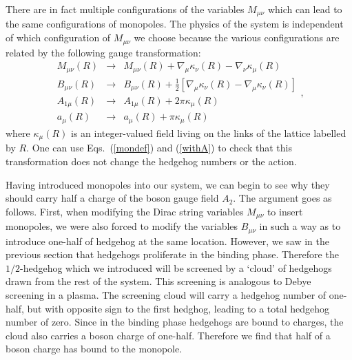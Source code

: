 \documentclass[prb,twocolumn]{revtex4-1}
\begin{document}
There are in fact multiple configurations of the variables $M_{\mu\nu}$ which can lead to the same configurations of  monopoles. The physics of the system is independent of which configuration of $M_{\mu\nu}$ we choose because the various configurations are related by the following gauge transformation:
\begin{equation}
\begin{array}{ccc}
M_{\mu\nu}(R)&\rightarrow&M_{\mu\nu}(R)+\nabla_\mu \kappa_\nu(R)-\nabla_\nu \kappa_\mu(R) \\
B_{\mu\nu}(R)&\rightarrow&B_{\mu\nu}(R)+\frac{1}{2}[\nabla_\mu \kappa_\nu(R)-\nabla_\mu \kappa_\nu(R)] \\
A_{1\mu}(R)&\rightarrow&A_{1\mu}(R)+2\pi \kappa_\mu(R)\\
a_\mu(R)&\rightarrow&a_\mu(R)+\pi \kappa_\mu(R)
\end{array},
\end{equation}
where $\kappa_\mu(R)$ is an integer-valued field living on the links of the lattice labelled by $R$. One can use Eqs.~(\ref{mondef}) and (\ref{withA}) to check that this transformation does not change the hedgehog numbers or the action.

Having introduced monopoles into our system, we can begin to see why they should carry half a charge of the boson gauge field $A_2$. 
The argument goes as follows. First, when modifying the Dirac string variables $M_{\mu\nu}$ to insert monopoles, we were also forced to modify the variables $B_{\mu\nu}$ in such a way as to introduce one-half of hedgehog at the same location. However, we saw in the previous section that hedgehogs proliferate in the binding phase. Therefore the $1/2$-hedgehog which we introduced will be screened by a `cloud' of hedgehogs drawn from the rest of the system. This screening is analogous to Debye screening in a plasma. The screening cloud will carry a hedgehog number of one-half, but with opposite sign to the first hedghog, leading to a total hedgehog number of zero. Since in the binding phase hedgehogs are bound to charges, the cloud also carries a boson charge of one-half. Therefore we find that half of a boson charge has bound to the monopole.

\end{document}
